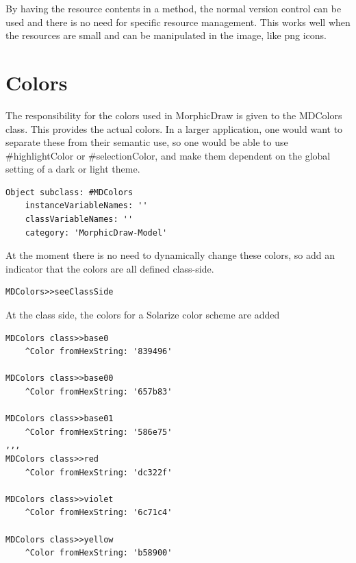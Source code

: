 \documentclass[10pt, twoside]{article}   	%
\begin{document}
By having the resource contents in a method, the normal version
control can be used and there is no need for specific resource
management. This works well when the resources are small and can be
manipulated in the image, like png icons.  

\section{Colors}
The responsibility for the colors used in MorphicDraw is given to the MDColors class.
This provides the actual colors. In a larger application, one would want to
separate these from their semantic use, so one would be able to use
 \#highlightColor or \#selectionColor, and make them dependent on the global
 setting of a dark or light theme.
\begin{verbatim}
Object subclass: #MDColors
    instanceVariableNames: ''
    classVariableNames: ''
    category: 'MorphicDraw-Model'
\end{verbatim}
At the moment there is no need to dynamically change these colors, so add
an indicator that the colors are all defined class-side.
\begin{verbatim}
MDColors>>seeClassSide
\end{verbatim}
At the class side, the colors for a Solarize color scheme are added
\begin{verbatim}
MDColors class>>base0
    ^Color fromHexString: '839496'

MDColors class>>base00
    ^Color fromHexString: '657b83'

MDColors class>>base01
    ^Color fromHexString: '586e75'
,,,
MDColors class>>red
    ^Color fromHexString: 'dc322f'

MDColors class>>violet
    ^Color fromHexString: '6c71c4'

MDColors class>>yellow
    ^Color fromHexString: 'b58900'
\end{verbatim}

\end{document}
